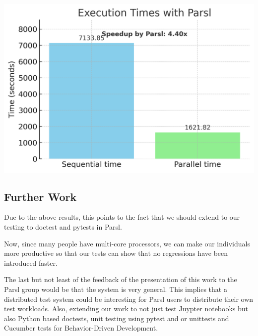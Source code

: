 \noindent
\begin{minipage}{0.49\textwidth}
    \centering
    \includegraphics[width=\textwidth]{booktests/parsl_speedup_chart_no_x_lines.png}
    \label{fig:bm_iid}
\end{minipage}

\subsection{Further Work}

Due to the above results, this points to the fact that we should extend to our testing to doctest and pytests in Parsl.

Now, since many people have multi-core processors, we can make our individuals more productive so that our tests can show that no regressions have been introduced faster.


The last but not least of the feedback of the presentation of this work to the Parsl group would be that the system is very general. This implies that a distributed test system could be interesting for Parsl users to distribute their own test workloads. 
Also, extending our work to not just test Juypter notebooks but also Python based doctests, unit testing using pytest and or unittests and Cucumber tests for Behavior-Driven Development.




